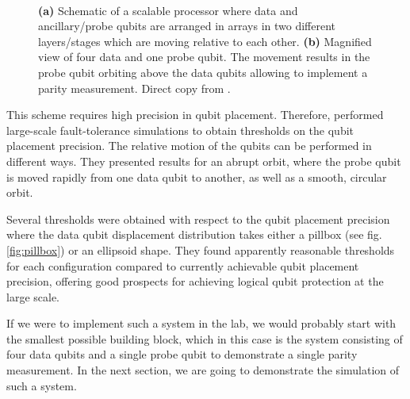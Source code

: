 \begin{figure}[H]
	\centering
	\\
	\caption[paper]{\textbf{(a)} Schematic of a scalable processor where data and ancillary/probe qubits are arranged in arrays in two different layers/stages which are moving relative to each other. \textbf{(b)} Magnified view of four data and one probe qubit. The movement results in the probe qubit orbiting above the data qubits allowing to implement a parity measurement. Direct copy from \cite{OGorman2016}.}
	\label{FIG:paper}
\end{figure}

This scheme requires high precision in qubit placement. Therefore, \citet{OGorman2016} performed large-scale fault-tolerance simulations to obtain thresholds on the qubit placement precision. The relative motion of the qubits can be performed in different ways. They presented results for an abrupt orbit, where the probe qubit is moved rapidly from one data qubit to another, as well as a smooth, circular orbit.

Several thresholds were obtained with respect to the qubit placement precision where the data qubit displacement distribution takes either a pillbox (see fig.\@ \ref{fig:pillbox}) or an ellipsoid shape. 
They found apparently reasonable thresholds for each configuration compared to currently achievable qubit placement precision, offering good prospects for achieving logical qubit protection at the large scale. 

If we were to implement such a system in the lab, we would probably start with the smallest possible building block, which in this case is the system consisting of four data qubits and a single probe qubit to demonstrate a single parity measurement. In the next section, we are going to demonstrate the simulation of such a system. 

